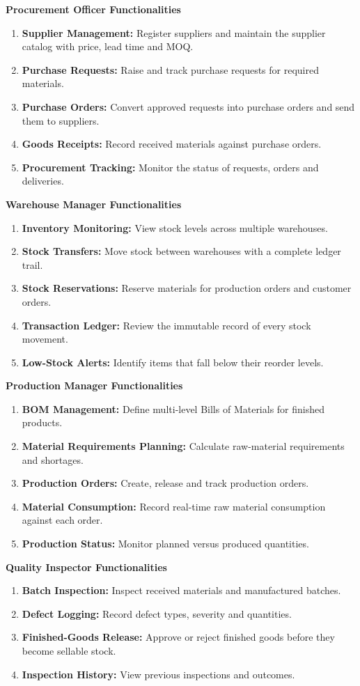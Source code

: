\documentclass[12pt,a4paper]{report}
\begin{document}
\textbf{Procurement Officer Functionalities}
\begin{enumerate}
\item \textbf{Supplier Management:} Register suppliers and maintain the supplier catalog with price, lead time and MOQ.
\item \textbf{Purchase Requests:} Raise and track purchase requests for required materials.
\item \textbf{Purchase Orders:} Convert approved requests into purchase orders and send them to suppliers.
\item \textbf{Goods Receipts:} Record received materials against purchase orders.
\item \textbf{Procurement Tracking:} Monitor the status of requests, orders and deliveries.
\end{enumerate}

\textbf{Warehouse Manager Functionalities}
\begin{enumerate}
\item \textbf{Inventory Monitoring:} View stock levels across multiple warehouses.
\item \textbf{Stock Transfers:} Move stock between warehouses with a complete ledger trail.
\item \textbf{Stock Reservations:} Reserve materials for production orders and customer orders.
\item \textbf{Transaction Ledger:} Review the immutable record of every stock movement.
\item \textbf{Low-Stock Alerts:} Identify items that fall below their reorder levels.
\end{enumerate}

\textbf{Production Manager Functionalities}
\begin{enumerate}
\item \textbf{BOM Management:} Define multi-level Bills of Materials for finished products.
\item \textbf{Material Requirements Planning:} Calculate raw-material requirements and shortages.
\item \textbf{Production Orders:} Create, release and track production orders.
\item \textbf{Material Consumption:} Record real-time raw material consumption against each order.
\item \textbf{Production Status:} Monitor planned versus produced quantities.
\end{enumerate}

\textbf{Quality Inspector Functionalities}
\begin{enumerate}
\item \textbf{Batch Inspection:} Inspect received materials and manufactured batches.
\item \textbf{Defect Logging:} Record defect types, severity and quantities.
\item \textbf{Finished-Goods Release:} Approve or reject finished goods before they become sellable stock.
\item \textbf{Inspection History:} View previous inspections and outcomes.
\end{enumerate}
\end{document}
